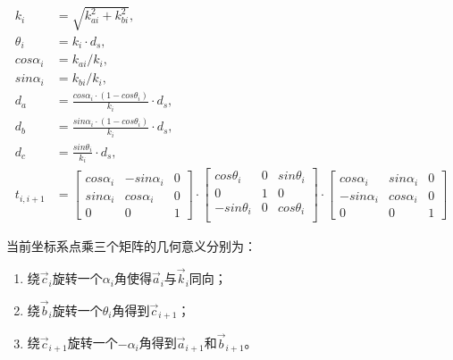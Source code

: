 \begin{itemize}
\begin{enumerate}[label=(\Alph*)]
        \begin{align}
            k_i &= \sqrt{k_{ai} ^ 2 + k_{bi} ^ 2}, \\
            \theta_i &= k_i \cdot d_s, \\
            cos\alpha_i &= k_{ai} / k_i, \\
            sin\alpha_i &= k_{bi} / k_i, \\
            d_a &= \frac{cos\alpha_i \cdot (1 - cos\theta_i)}{k_i} \cdot d_s, \\
            d_b &= \frac{sin\alpha_i \cdot (1 - cos\theta_i)}{k_i} \cdot d_s, \\
            d_c &= \frac{sin\theta_i}{k_i} \cdot d_s, \\
            t_{i, i+1} &= \left[
                \begin{matrix}
                    cos \alpha_i & -sin \alpha_i & 0 \\
                    sin \alpha_i & cos \alpha_i & 0 \\
                    0 & 0 & 1
                \end{matrix}
                \right]
                \cdot
                \left[
                \begin{matrix}
                    cos \theta_i & 0 & sin \theta_i \\
                    0 & 1 & 0 \\
                    -sin \theta_i & 0 & cos \theta_i \\
                \end{matrix}
                \right]
                \cdot
                \left[
                \begin{matrix}
                    cos \alpha_i & sin \alpha_i & 0 \\
                    -sin \alpha_i & cos \alpha_i & 0 \\
                    0 & 0 & 1
                \end{matrix}
                \right] \label{alg:reconstruction}
        \end{align}

        当前坐标系点乘三个矩阵的几何意义分别为：\\
        \begin{enumerate}
            \item 绕$\vec c_i$旋转一个$\alpha_i$角使得$\vec a_i$与$\vec k_i$同向；
            \item 绕$\vec b_i$旋转一个$\theta_i$角得到$\vec c_{i+1}$；
            \item 绕$\vec c_{i+1}$旋转一个$-\alpha_i$角得到$\vec a_{i+1}$和$\vec b_{i+1}$。
        \end{enumerate}


\end{enumerate}
\end{itemize}
